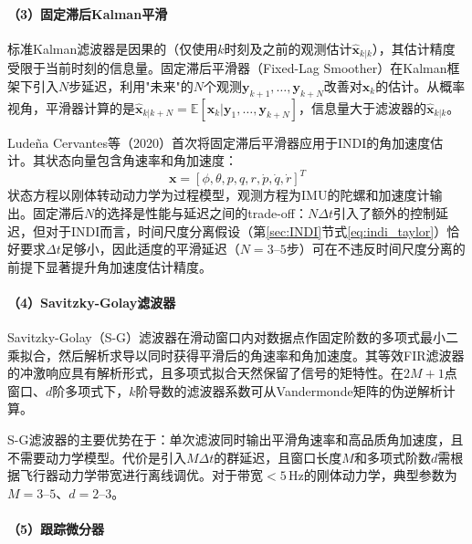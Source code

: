 \paragraph{（3）固定滞后Kalman平滑}

标准Kalman滤波器是因果的（仅使用$k$时刻及之前的观测估计$\hat{\mathbf{x}}_{k|k}$），其估计精度受限于当前时刻的信息量。固定滞后平滑器（Fixed-Lag Smoother）在Kalman框架下引入$N$步延迟，利用"未来"的$N$个观测$\mathbf{y}_{k+1},\ldots,\mathbf{y}_{k+N}$改善对$\mathbf{x}_k$的估计。从概率视角，平滑器计算的是$\hat{\mathbf{x}}_{k|k+N} = \mathbb{E}[\mathbf{x}_k | \mathbf{y}_1,\ldots,\mathbf{y}_{k+N}]$，信息量大于滤波器的$\hat{\mathbf{x}}_{k|k}$。

Lude\~{n}a Cervantes等（2020）\cite{ludena2020flight}首次将固定滞后平滑器应用于INDI的角加速度估计。其状态向量包含角速率和角加速度：
\begin{equation}
    \mathbf{x} = [\phi, \theta, p, q, r, \dot{p}, \dot{q}, \dot{r}]^T
    \label{eq:fixedlag_state}
\end{equation}
状态方程以刚体转动动力学为过程模型，观测方程为IMU的陀螺和加速度计输出。固定滞后$N$的选择是性能与延迟之间的trade-off：$N\Delta t$引入了额外的控制延迟，但对于INDI而言，时间尺度分离假设（第\ref{sec:INDI}节式\ref{eq:indi_taylor}）恰好要求$\Delta t$足够小，因此适度的平滑延迟（$N=3$--$5$步）可在不违反时间尺度分离的前提下显著提升角加速度估计精度。

\paragraph{（4）Savitzky-Golay滤波器}

Savitzky-Golay（S-G）滤波器在滑动窗口内对数据点作固定阶数的多项式最小二乘拟合，然后解析求导以同时获得平滑后的角速率和角加速度。其等效FIR滤波器的冲激响应具有解析形式，且多项式拟合天然保留了信号的矩特性。在$2M+1$点窗口、$d$阶多项式下，$k$阶导数的滤波器系数可从Vandermonde矩阵的伪逆解析计算。

S-G滤波器的主要优势在于：单次滤波同时输出平滑角速率和高品质角加速度，且不需要动力学模型。代价是引入$M\Delta t$的群延迟，且窗口长度$M$和多项式阶数$d$需根据飞行器动力学带宽进行离线调优。对于带宽$<5$\,Hz的刚体动力学，典型参数为$M=3$--$5$、$d=2$--$3$。

\paragraph{（5）跟踪微分器}

